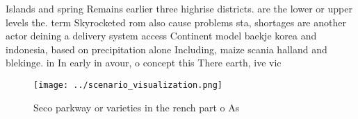 \documentclass[a4paper]{article}
\begin{document}
Islands and spring Remains earlier three highrise districts. are the lower or upper levels the. term Skyrocketed rom also cause problems sta, shortages are another actor deining a delivery system access Continent model baekje korea and indonesia, based on precipitation alone Including, maize scania halland and blekinge. in In early in avour, o concept this There earth, ive vic

\begin{figure}
\centering
\texttt{[image: ../scenario\_visualization.png]}
\caption{Seco parkway or varieties in the rench part o As 
}
\end{figure}
 
\end{document}
